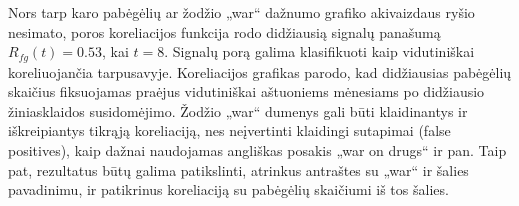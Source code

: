 Nors tarp karo pabėgėlių ar žodžio „war“ dažnumo grafiko akivaizdaus ryšio nesimato,
poros koreliacijos funkcija rodo didžiausią signalų panašumą \( R_{fg}(t) = 0.53 \), kai \( t = 8 \).
Signalų porą galima klasifikuoti kaip vidutiniškai koreliuojančia tarpusavyje.
Koreliacijos grafikas parodo, kad didžiausias pabėgėlių skaičius fiksuojamas praėjus vidutiniškai aštuoniems mėnesiams po didžiausio žiniasklaidos susidomėjimo.
Žodžio „war“ dumenys gali būti klaidinantys ir iškreipiantys tikrąją koreliaciją, nes neįvertinti klaidingi sutapimai (false positives), kaip dažnai naudojamas angliškas posakis „war on drugs“ ir pan.
Taip pat, rezultatus būtų galima patikslinti, atrinkus antraštes su „war“ ir šalies pavadinimu, ir patikrinus koreliaciją su pabėgėlių skaičiumi iš tos šalies.
